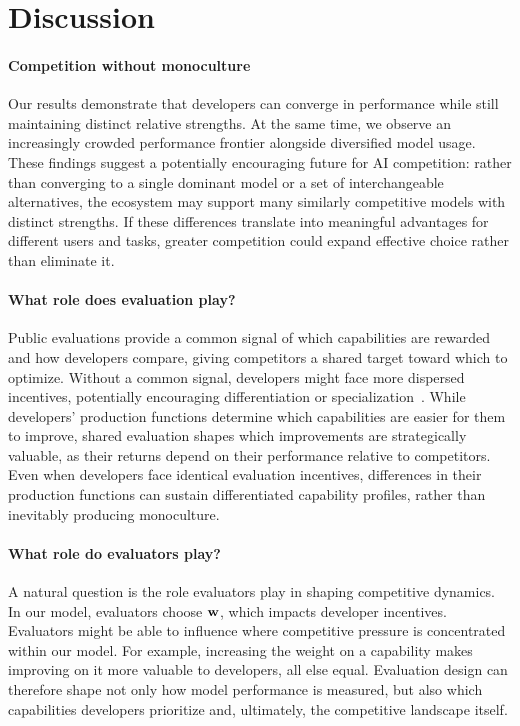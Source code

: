 \section{Discussion}
\paragraph{Competition without monoculture}
Our results demonstrate that developers can converge in performance while still maintaining distinct relative strengths.
At the same time, we observe an increasingly crowded performance frontier alongside diversified model usage. 
These findings suggest a potentially encouraging future for AI competition: rather than converging to a single dominant model or a set of interchangeable alternatives, the ecosystem may support many similarly competitive models with distinct strengths. 
If these differences translate into meaningful advantages for different users and tasks, greater competition could expand effective choice rather than eliminate it.

\paragraph{What role does evaluation play?}
Public evaluations provide a common signal of which capabilities are rewarded and how developers compare, giving competitors a shared target toward which to optimize.
Without a common signal, developers might face more dispersed incentives, potentially encouraging differentiation or specialization~\citep{competition_diversity}.
While developers' production functions determine which capabilities are easier for them to improve, shared evaluation shapes which improvements are strategically valuable, as their returns depend on their performance relative to competitors.
Even when developers face identical evaluation incentives, differences in their production functions can sustain differentiated capability profiles, rather than inevitably producing monoculture.

\paragraph{What role do evaluators play?}
A natural question is the role evaluators play in shaping competitive dynamics.
In our model, evaluators choose $\mathbf{w}$, which impacts developer incentives.
Evaluators might be able to influence where competitive pressure is concentrated within our model.
For example, increasing the weight on a capability makes improving on it more valuable to developers, all else equal.
Evaluation design can therefore shape not only how model performance is measured, but also which capabilities developers prioritize and, ultimately, the competitive landscape itself.

